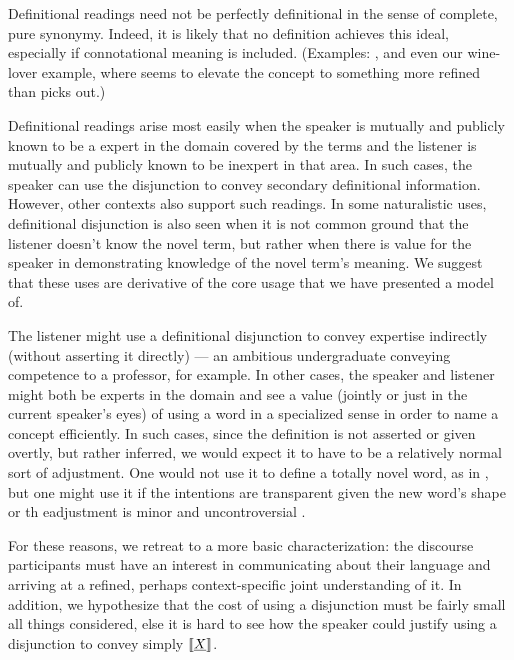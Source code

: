 \documentclass{article}
\begin{document}
Definitional readings need not be perfectly definitional in the sense
of complete, pure synonymy. Indeed, it is likely that no definition
achieves this ideal, especially if connotational meaning is
included. (Examples: , and even our
wine-lover example, where  seems to elevate the
concept to something more refined than  picks out.)

Definitional readings arise most easily when the speaker is mutually
and publicly known to be a expert in the domain covered by the terms
and the listener is mutually and publicly known to be inexpert in that
area. In such cases, the speaker can use the disjunction to convey
secondary definitional information. However, other contexts also
support such readings. In some naturalistic uses, definitional
disjunction is also seen when it is not common ground that the
listener doesn't know the novel term, but rather when there is value
for the speaker in demonstrating knowledge of the novel term's
meaning.  We suggest that these uses are derivative of the core usage
that we have presented a model of.

The listener might use a definitional disjunction to convey expertise
indirectly (without asserting it directly) --- an ambitious
undergraduate conveying competence to a professor, for example. In
other cases, the speaker and listener might both be experts in the
domain and see a value (jointly or just in the current speaker's eyes)
of using a word in a specialized sense in order to name a concept
efficiently. In such cases, since the definition is not asserted or
given overtly, but rather inferred, we would expect it to have to be a
relatively normal sort of adjustment. One would not use it to define a
totally novel word, as in , but one might use it
if the intentions are transparent given the new word's shape  or th eadjustment is minor and
uncontroversial .

For these reasons, we retreat to a more basic characterization: the
discourse participants must have an interest in communicating about
their language and arriving at a refined, perhaps context-specific
joint understanding of it. In addition, we hypothesize that the cost
of using a disjunction must be fairly small all things considered,
else it is hard to see how the speaker could justify using a
disjunction  to convey simply $\llbracket\emph{X}\rrbracket$.
\end{document}
